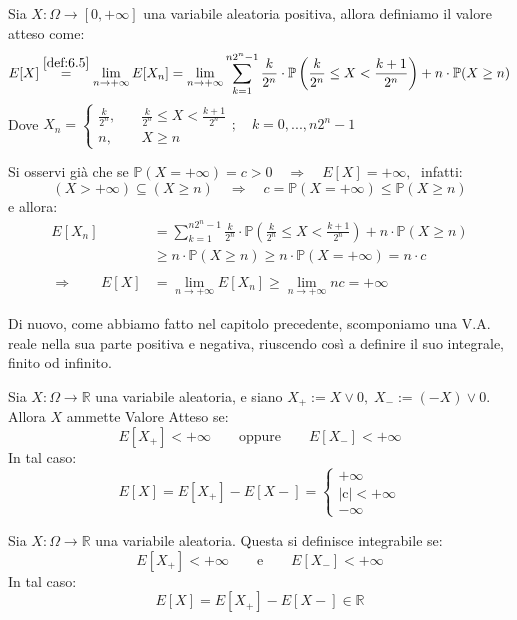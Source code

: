 \begin{definizione}
    Sia $X:\Omega\to[0, +\infty]$ una variabile aleatoria positiva, allora definiamo il valore atteso come:
    \[E[X] \overset{\ref{def:6.5}}{=} \lim_{n\to+\infty} E[X_n]  = \lim_{n\to+\infty} \sum_{k=1}^{n2^n - 1} \frac{k}{2^n} \cdot \mathbb{P}\left(\frac{k}{2^n}\leq X<\frac{k+1}{2^n}\right) + n\cdot \mathbb{P}(X\geq n)\]
    Dove $X_n = \begin{cases}
        \frac{k}{2^n}, \quad &\frac{k}{2^n}\leq X<\frac{k+1}{2^n}\\
        n, &X\geq n
    \end{cases}; \quad k = 0, ..., n2^n-1$
\end{definizione}

\noindent Si osservi già che se $\mathbb{P}(X=+\infty) = c>0\quad \Rightarrow\quad E[X] = +\infty, \;$ infatti:
\[(X>+\infty)\subseteq(X\geq n) \quad \Rightarrow\quad c = \mathbb{P}(X=+\infty) \leq \mathbb{P}(X\geq n)\]
e allora:
\begin{align*}
    E[X_n] &= \sum_{k=1}^{n2^n - 1} \frac{k}{2^n} \cdot \mathbb{P}\left(\frac{k}{2^n}\leq X<\frac{k+1}{2^n}\right) + n\cdot \mathbb{P}(X\geq n) \\
    & \geq n\cdot \mathbb{P}(X\geq n) \geq n\cdot \mathbb{P}(X = +\infty) = n\cdot c \\
    \\
    \Rightarrow\qquad E[X] &= \lim_{n\to+\infty} E[X_n] \geq \lim_{n\to+\infty} nc = +\infty
\end{align*}

\bigskip
\noindent Di nuovo, come abbiamo fatto nel capitolo precedente, scomponiamo una V.A. reale nella sua parte positiva e negativa, riuscendo così a definire il suo integrale, finito od infinito.

\begin{definizione}
    Sia $X:\Omega\to\mathbb{R}$ una variabile aleatoria, e siano $X_+:=X\vee0, \;X_-:=(-X)\vee 0$. Allora $X$ ammette Valore Atteso se:
    \[E[X_+]<+\infty \qquad \text{oppure}\qquad E[X_-]<+\infty\]
    In tal caso:
    \[E[X] = E[X_+] - E[X-] = \begin{cases}
        +\infty\\
        |\text{c}| < +\infty\\
        -\infty
    \end{cases}\]
\end{definizione}

\begin{definizione}[Integrabilità di $X$]
    Sia $X:\Omega\to\mathbb{R}$ una variabile aleatoria. Questa si definisce integrabile se:
    \[E[X_+]<+\infty \qquad \text{e}\qquad E[X_-]<+\infty\]
    In tal caso:
    \[E[X] = E[X_+] - E[X-] \in \mathbb{R}\]
\end{definizione}


